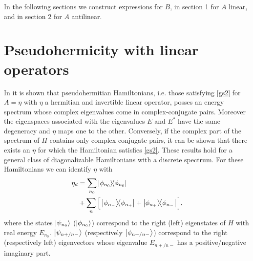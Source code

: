 In the following sections we construct expressions for $B$, in section 1 for $A$ linear, and in section 2 for $A$ antilinear.

\section{Pseudohermicity with linear operators}
%
In \cite{Mostafazadeh2002,Mostafazadeh2002a,Mostafazadeh2002b} it is shown that pseudohermitian Hamiltonians, i.e. those satisfying \eqref{gs2} for $A=\eta$ with $\eta$ a hermitian and invertible linear operator, posses an energy spectrum whose complex eigenvalues come in complex-conjugate pairs. Moreover the eigenspaces associated with  the eigenvalues $E$ and $E^*$ have the same degeneracy and $\eta$ maps one to the other. Conversely, if the complex part of the spectrum of $H$ contains only complex-conjugate pairs, it can be shown that there exists an $\eta$ for which the Hamiltonian satisfies \eqref{gs2}.
These results hold for a general class of diagonalizable Hamiltonians with a discrete spectrum. For these Hamiltonians we can identify $\eta$ with
%
\begin{equation}
    \begin{split}
    \eta_{d} &= \sum_{n_0} \ketbra{\phi_{n_0}}{\phi_{n_0}}\\ &+ \sum_n \Big[\ketbra{\phi_{n_-}}{\phi_{n_+}} +  \ketbra{\phi_{n_+}}{\phi_{n_-}}\Big],
    \end{split}
    \label{eq:DiscreteEta}
\end{equation}
%
%
%
where the states $\ket{\psi_{n_0}}$ ($\ket{\phi_{n_0}}$) correspond to the right (left) eigenstates of $H$ with real energy $E_{n_0}$.
$\ket{\psi_{n+/n-}}$  (respectively $\ket{\phi_{n+/n-}}$) correspond to the right (respectively left) eigenvectors whose eigenvalue $E_{n+/n-}$  has a positive/negative imaginary part.
